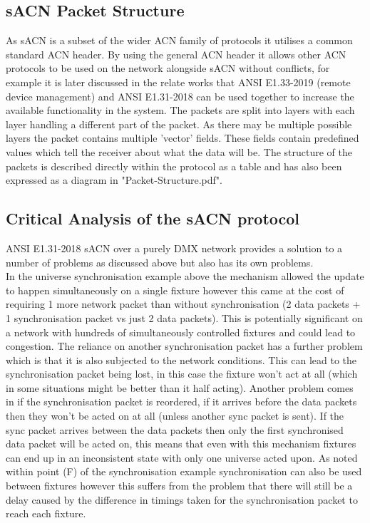 \documentclass[11pt,a4paper]{article}
\begin{document}
\subsection{sACN Packet Structure}
As sACN is a subset of the wider ACN family of protocols it utilises a common standard ACN header. By using the general ACN header it allows other ACN protocols to be used on the network alongside sACN without conflicts, for example it is later discussed in the relate works that ANSI E1.33-2019 (remote device management) and ANSI E1.31-2018 can be used together to increase the available functionality in the system. The packets are split into layers with each layer handling a different part of the packet. As there may be multiple possible layers the packet contains multiple 'vector' fields. These fields contain predefined values which tell the receiver about what the data will be. The structure of the packets is described directly within the protocol as a table and has also been expressed as a diagram in "Packet-Structure.pdf".

\subsection{Critical Analysis of the sACN protocol}
ANSI E1.31-2018 sACN over a purely DMX network provides a solution to a number of problems as discussed above but also has its own problems.\\

In the universe synchronisation example above the mechanism allowed the update to happen simultaneously on a single fixture however this came at the cost of requiring 1 more network packet than without synchronisation (2 data packets + 1 synchronisation packet vs just 2 data packets). This is potentially significant on a network with hundreds of simultaneously controlled fixtures and could lead to congestion. The reliance on another synchronisation packet has a further problem which is that it is also subjected to the network conditions. This can lead to the synchronisation packet being lost, in this case the fixture won't act at all (which in some situations might be better than it half acting). Another problem comes in if the synchronisation packet is reordered, if it arrives before the data packets then they won't be acted on at all (unless another sync packet is sent). If the sync packet arrives between the data packets then only the first synchronised data packet will be acted on, this means that even with this mechanism fixtures can end up in an inconsistent state with only one universe acted upon. As noted within point (F) of the synchronisation example synchronisation can also be used between fixtures however this suffers from the problem that there will still be a delay caused by the difference in timings taken for the synchronisation packet to reach each fixture.\\
\end{document}

